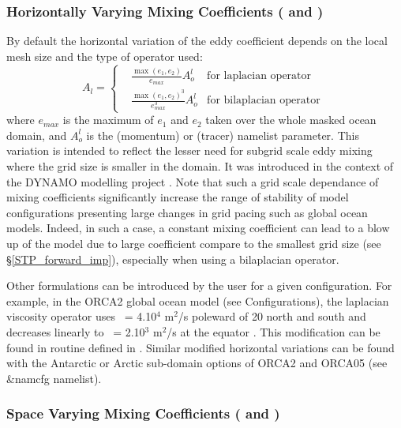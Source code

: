 \documentclass[NEMO_book]{subfiles}
\begin{document}
\subsubsection{Horizontally Varying Mixing Coefficients ( and )}
By default the horizontal variation of the eddy coefficient depends on the local mesh 
size and the type of operator used:
\begin{equation} \label{Eq_title}
  A_l = \left\{     
   \begin{aligned}
         & \frac{\max(e_1,e_2)}{e_{max}} A_o^l  			& \text{for laplacian operator } \\
         & \frac{\max(e_1,e_2)^{3}}{e_{max}^{3}} A_o^l          & \text{for bilaplacian operator } 
   \end{aligned}    \right.
\end{equation}
where $e_{max}$ is the maximum of $e_1$ and $e_2$ taken over the whole masked 
ocean domain, and $A_o^l$ is the  (momentum) or  (tracer) 
namelist parameter. This variation is intended to reflect the lesser need for subgrid 
scale eddy mixing where the grid size is smaller in the domain. It was introduced in 
the context of the DYNAMO modelling project \citep{Willebrand_al_PO01}. 
Note that such a grid scale dependance of mixing coefficients significantly increase 
the range of stability of model configurations presenting large changes in grid pacing 
such as global ocean models. Indeed, in such a case, a constant mixing coefficient 
can lead to a blow up of the model due to large coefficient compare to the smallest 
grid size (see \S\ref{STP_forward_imp}), especially when using a bilaplacian operator.

Other formulations can be introduced by the user for a given configuration. 
For example, in the ORCA2 global ocean model (see Configurations), the laplacian 
viscosity operator uses ~= 4.10$^4$ m$^2$/s poleward of 20\deg 
north and south and decreases linearly to ~= 2.10$^3$ m$^2$/s 
at the equator \citep{Madec_al_JPO96, Delecluse_Madec_Bk00}. This modification 
can be found in routine  defined in . 
Similar modified horizontal variations can be found with the Antarctic or Arctic 
sub-domain options of ORCA2 and ORCA05 (see \&namcfg namelist).

\subsubsection{Space Varying Mixing Coefficients ( and )}
\end{document}
